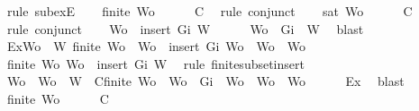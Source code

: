\begin{isabellebody}
\ {\isacharparenleft}rule\ subexE{\isacharparenright}\isanewline
\ \ \isamarkupfalse%
\ {\isachardoublequoteopen}finite\ Wo{\isachardoublequoteclose}\isanewline
\ \ \ \ \isamarkupfalse%
\ C{}\ \isamarkupfalse%
\ {\isacharparenleft}rule\ conjunct{}{\isacharparenright}\isanewline
\ \ \isamarkupfalse%
\ {\isachardoublequoteopen}{\isasymnot}{\isacharparenleft}sat\ Wo{\isacharparenright}{\isachardoublequoteclose}\isanewline
\ \ \ \ \isamarkupfalse%
\ C{}\ \isamarkupfalse%
\ {\isacharparenleft}rule\ conjunct{}{\isacharparenright}\isanewline
\ \ \isamarkupfalse%
\ {\isachardoublequoteopen}Wo\ {\isasymsubseteq}\ insert\ Gi\ W{\isachardoublequoteclose}\isanewline
\ \ \ \ \isamarkupfalse%
\ {\isacartoucheopen}Wo\ {\isasymsubseteq}\ {\isacharbraceleft}Gi{\isacharbraceright}\ {\isasymunion}\ W{\isacartoucheclose}\ \isamarkupfalse%
\ blast\ \isanewline
\ \ \isamarkupfalse%
\ Ex{}{\isacharcolon}{\isachardoublequoteopen}{\isasymexists}Wo{\isacharprime}\ {\isasymsubseteq}\ W{\isachardot}\ finite\ Wo{\isacharprime}\ {\isasymand}\ {\isacharparenleft}Wo\ {\isacharequal}\ insert\ Gi\ Wo{\isacharprime}\ {\isasymor}\ Wo\ {\isacharequal}\ Wo{\isacharprime}{\isacharparenright}{\isachardoublequoteclose}\isanewline
\ \ \ \ \isamarkupfalse%
\ {\isacartoucheopen}finite\ Wo{\isacartoucheclose}\ {\isacartoucheopen}Wo\ {\isasymsubseteq}\ insert\ Gi\ W{\isacartoucheclose}\ \isamarkupfalse%
\ {\isacharparenleft}rule\ finite{\isacharunderscore}subset{\isacharunderscore}insert{}{\isacharparenright}\isanewline
\ \ \isamarkupfalse%
\ Wo{\isacharprime}\ \ {\isachardoublequoteopen}Wo{\isacharprime}\ {\isasymsubseteq}\ W{\isachardoublequoteclose}\ \ C{}{\isacharcolon}{\isachardoublequoteopen}finite\ Wo{\isacharprime}\ {\isasymand}\ {\isacharparenleft}Wo\ {\isacharequal}\ {\isacharbraceleft}Gi{\isacharbraceright}\ {\isasymunion}\ Wo{\isacharprime}\ {\isasymor}\ Wo\ {\isacharequal}\ Wo{\isacharprime}{\isacharparenright}{\isachardoublequoteclose}\isanewline
\ \ \ \ \isamarkupfalse%
\ Ex{}\ \isamarkupfalse%
\ blast\isanewline
\ \ \isamarkupfalse%
\ {\isachardoublequoteopen}finite\ Wo{\isacharprime}{\isachardoublequoteclose}\isanewline
\ \ \ \ \isamarkupfalse%
\ C{}\ \isamarkupfalse%

\end{isabellebody}
